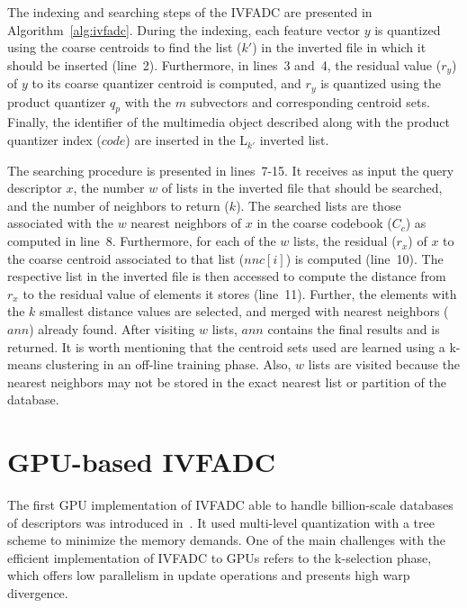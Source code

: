 The indexing and searching steps of the IVFADC are presented in Algorithm~\ref{alg:ivfadc}. 
During the indexing, each feature vector $y$ is quantized using the coarse centroids to find the list ($k'$)
in the inverted file in which it should be inserted (line~2). Furthermore, in lines~3 and~4, the 
residual value ($r_y$) of $y$ to its coarse quantizer centroid is computed, and $r_y$ is 
quantized using the product quantizer $q_p$ with the $m$ subvectors and 
corresponding centroid sets. Finally, the identifier of the multimedia object described
along with the product quantizer index ($code$) are inserted in the L$_{k'}$ inverted list.

The searching procedure is presented in lines~7-15. It receives as input the query descriptor $x$, 
the number $w$ of lists in the inverted file that should be searched, and the number of 
neighbors to return ($k$). The searched lists are those associated with the $w$ nearest 
neighbors of $x$ in the coarse codebook ($C_c$) as computed in line~8. Furthermore, for each of 
the $w$ lists, the residual ($r_x$) of $x$ to the coarse centroid associated to that list ($nnc[i]$) is 
computed (line~10). The respective list in the inverted file is then accessed to compute 
the distance from $r_x$ to the residual value of elements it stores (line~11). Further, the elements with the $k$ smallest
distance values are selected, and merged with nearest neighbors ($ann$) already found. After 
visiting $w$ lists, $ann$ contains the final results and is returned. It is worth mentioning that the
centroid sets used are learned using a k-means clustering in an off-line
training phase. Also, $w$ lists are visited because the nearest neighbors may not be stored in
the exact nearest list or partition of the database.

\section{GPU-based IVFADC}

The first GPU implementation of IVFADC able to handle billion-scale databases of descriptors was
introduced in~\cite{7780592}. It used multi-level quantization with a tree scheme
to minimize the memory demands. One of the main challenges with the efficient implementation 
of IVFADC to GPUs refers to the k-selection phase, which offers low parallelism 
in update operations and presents high warp divergence.

